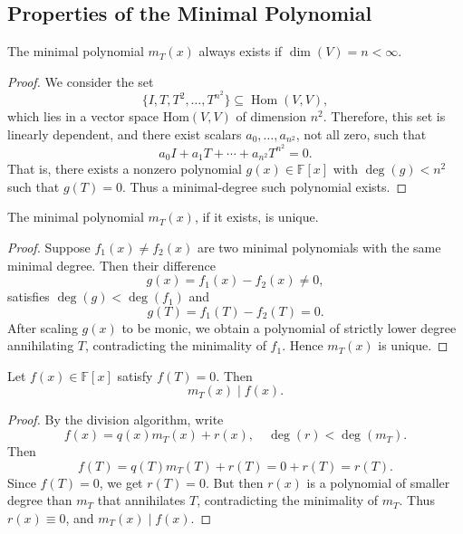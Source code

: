 \subsection{ Properties of the Minimal Polynomial}

\begin{proposition}[Existence]\label{prop:minpoly-existence}
The minimal polynomial \( m_T(x) \) always exists if \( \dim(V) = n < \infty \).
\end{proposition}

\begin{proof}
We consider the set
\[
\{ I, T, T^2, \dots, T^{n^2} \} \subseteq \operatorname{Hom}(V, V),
\]
which lies in a vector space $\mathrm{Hom}(V,V)$ of dimension \( n^2 \). Therefore, this set is linearly dependent, and there exist scalars \( a_0, \dots, a_{n^2} \), not all zero, such that
\[
a_0 I + a_1 T + \cdots + a_{n^2} T^{n^2} = 0.
\]
That is, there exists a nonzero polynomial \( g(x) \in \mathbb{F}[x] \) with \( \deg(g) < n^2 \) such that \( g(T) = 0 \). Thus a minimal-degree such polynomial exists.
\end{proof}

\begin{proposition}[Uniqueness]\label{prop:minpoly-uniqueness}
The minimal polynomial \( m_T(x) \), if it exists, is unique.
\end{proposition}

\begin{proof}
Suppose \( f_1(x) \neq f_2(x) \) are two minimal polynomials with the same minimal degree. Then their difference
\[
g(x) = f_1(x) - f_2(x) \neq 0,
\]
satisfies \( \deg(g) < \deg(f_1) \) and
\[
g(T) = f_1(T) - f_2(T) = 0.
\]
After scaling \( g(x) \) to be monic, we obtain a polynomial of strictly lower degree annihilating \( T \), contradicting the minimality of \( f_1 \). Hence \( m_T(x) \) is unique.
\end{proof}

\begin{proposition}[Divisibility]\label{prop:minpoly-divides}
Let \( f(x) \in \mathbb{F}[x] \) satisfy \( f(T) = 0 \). Then
\[
m_T(x) \mid f(x).
\]
\end{proposition}

\begin{proof}
By the division algorithm, write
\[
f(x) = q(x) m_T(x) + r(x), \quad \deg(r) < \deg(m_T).
\]
Then
\[
f(T) = q(T) m_T(T) + r(T) = 0 + r(T) = r(T).
\]
Since \( f(T) = 0 \), we get \( r(T) = 0 \). But then \( r(x) \) is a polynomial of smaller degree than \( m_T \) that annihilates \( T \), contradicting the minimality of \( m_T \). Thus \( r(x) \equiv 0 \), and \( m_T(x) \mid f(x) \).
\end{proof}

